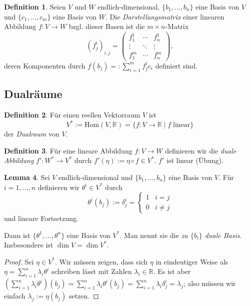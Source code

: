 \documentclass[a4paper]{scrbook}
\numberwithin{equation}{chapter}
\newcommand{\R}{\mathbb{R}}
\theoremstyle{definition}
\newtheorem{defn}{Definition}[section]
\newtheorem{lemma}[defn]{Lemma}
\begin{document}
\begin{defn}
	Seien $V$ und $W$ endlich-dimensional, $\{b_1,\dots,b_n\}$ eine Basis von $V$ und $\{c_1,\dots,c_m\}$ eine Basis von $W$. Die \emph{Darstellungsmatrix} einer linearen Abbildung $f\colon V \to W$ bzgl. dieser Basen ist die $m\times n$-Matrix
	\[(f^i_j)_{i,j} = \begin{pmatrix}
		f^1_1 & \cdots & f^1_n\\
		\vdots & \ddots & \vdots\\
		f^m_1 & \cdots & f^m_n
	\end{pmatrix},\]
	deren Komponenten durch $f(b_j) =: \sum_{i=1}^m f^i_j c_i$ definiert sind.
\end{defn}

\subsection{Dualräume}

\begin{defn}
	Für einen reellen Vektorraum $V$ ist
	\[V^* := \mathrm{Hom}(V,\R) = \{f\colon V \to \R \mid f \; \text{linear}\}\]
	der \emph{Dualraum} von $V$.
\end{defn}

\begin{defn}
	Für eine lineare Abbildung $f\colon V \to W$ definieren wir die \emph{duale Abbildung} $f' \colon W^* \to V^*$ durch $f'(\eta) := \eta \circ f \in V^*$. $f'$ ist linear (Übung).
\end{defn}

\begin{lemma}
	Sei $V$ endlich-dimensional und $\{b_1,\dots,b_n\}$ eine Basis von $V$. Für $i = 1,\dots,n$ definieren wir $\theta^i \in V^*$ durch
	\[\theta^i(b_j) := \delta^i_j = \begin{cases} 1 & i = j \\ 0 & i \ne j\end{cases}\]
	und lineare Fortsetzung.

	Dann ist $\{\theta^1, \dots, \theta^n\}$ eine Basis von $V^*$. Man nennt sie die \emph{zu $\{b_i\}$ duale Basis}. Insbesondere ist $\dim V = \dim V^*$.

	\begin{proof}
		Sei $\eta \in V^*$. Wir müssen zeigen, dass sich $\eta$ in eindeutiger Weise als $\eta = \sum_{i=1}^n \lambda_i \theta^i$ schreiben lässt mit Zahlen $\lambda_i\in\R$. Es ist aber $\left(\sum_{i=1}^n \lambda_i \theta^i\right)(b_j) = \sum_{i=1}^n \lambda_i \theta^i(b_j) = \sum_{i=1}^n \lambda_i \delta^i_j = \lambda_j$; also müssen wir einfach $\lambda_j := \eta(b_j)$ setzen.
	\end{proof}
\end{lemma}
\end{document}
